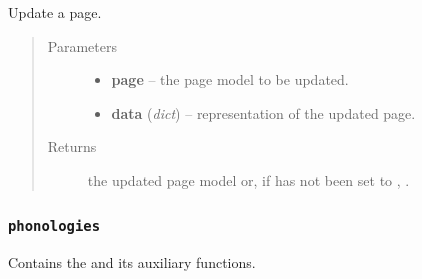 \documentclass[letterpaper,10pt,english]{sphinxmanual}
\begin{document}

\begin{fulllineitems}
\label{api:onlinelinguisticdatabase.controllers.pages.updatePage}
Update a page.
\begin{quote}\begin{description}
\item[{Parameters}] \leavevmode\begin{itemize}
\item {} 
\textbf{page} -- the page model to be updated.

\item {} 
\textbf{data} (\emph{dict}) -- representation of the updated page.

\end{itemize}

\item[{Returns}] \leavevmode
the updated page model or, if  has not been set
to , .

\end{description}\end{quote}

\end{fulllineitems}



\subsubsection{\texttt{phonologies}}
\label{api:phonologies}\label{api:module-onlinelinguisticdatabase.controllers.phonologies}
Contains the {\hyperref[api:onlinelinguisticdatabase.controllers.phonologies.PhonologiesController]{}} and its auxiliary functions.
\label{api:module-phonologies}
\end{document}
